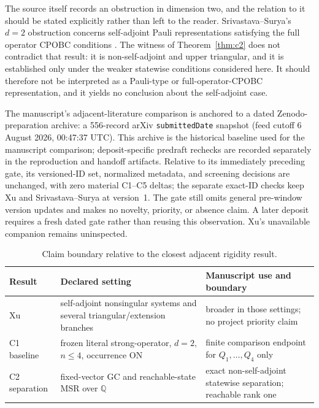 \documentclass[11pt]{article}
\theoremstyle{definition}
\theoremstyle{remark}
\newcommand{\QQ}{\mathbb{Q}}
\begin{document}
The source itself records an obstruction in dimension two, and the relation to
it should be stated explicitly rather than left to the reader.
Srivastava--Surya's \(d=2\) obstruction concerns self-adjoint Pauli
representations satisfying the full operator CPOBC conditions
\cite{SrivastavaSurya2026}.  The witness of Theorem~\ref{thm:c2} does not
contradict that result: it is non-self-adjoint and upper triangular, and it is
established only under the weaker statewise conditions considered here.  It
should therefore not be interpreted as a Pauli-type or full-operator-CPOBC
representation, and it yields no conclusion about the self-adjoint case.

The manuscript's adjacent-literature comparison is anchored to a dated
Zenodo-preparation archive: a 556-record arXiv \texttt{submittedDate} snapshot
(feed cutoff 6 August 2026, 00:47:37 UTC).  This archive is the historical
baseline used for the manuscript comparison; deposit-specific predraft
rechecks are recorded separately in the reproduction and handoff artifacts.
Relative to its immediately preceding gate, its versioned-ID set, normalized
metadata, and screening decisions are unchanged, with zero material C1--C5
deltas; the separate exact-ID checks keep Xu and Srivastava--Surya at
version~1.  The gate still omits general pre-window version updates and makes
no novelty, priority, or absence claim.  A later deposit requires a fresh
dated gate rather than reusing this observation.  Xu's unavailable companion
remains uninspected.

\begin{table}[ht]
\centering
\caption{Claim boundary relative to the closest adjacent rigidity result.}
\label{tab:xu-comparison}
\begin{tabularx}{\textwidth}{@{}p{}p{}X@{}}
\toprule
Result & Declared setting & Manuscript use and boundary\\
\midrule
Xu \cite{Xu2026Relational}
  & self-adjoint nonsingular systems and several triangular/extension branches
  & broader in those settings; no project priority claim\\
C1 baseline
  & frozen literal strong-operator, \(d=2\), \(n\leq4\), occurrence ON
  & finite comparison endpoint for \(Q_1,\ldots,Q_4\) only\\
C2 separation
  & fixed-vector GC and reachable-state MSR over \(\QQ\)
  & exact non-self-adjoint statewise separation; reachable rank one\\
\bottomrule
\end{tabularx}
\end{table}
\end{document}
